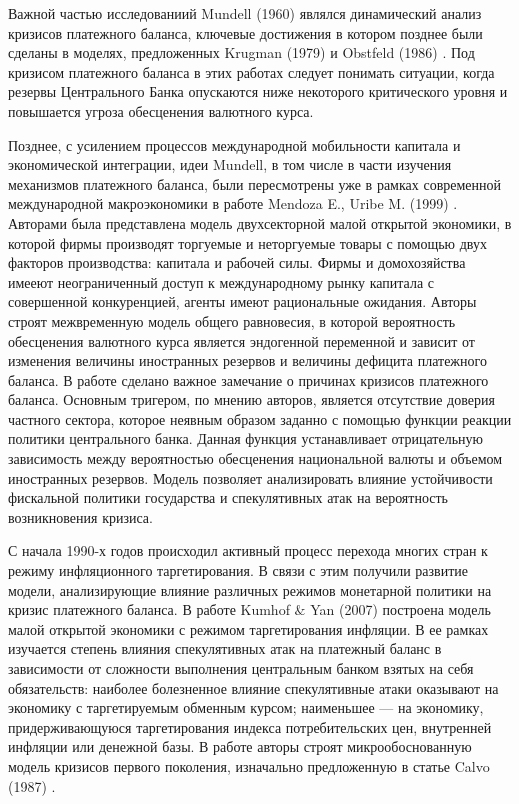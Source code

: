\documentclass[a4paper, 14pt]{extarticle}
\begin{document}
Важной частью исследованиий Mundell (1960) \autocite{mundell1960monetary} являлся динамический анализ кризисов платежного баланса, ключевые достижения в котором позднее были сделаны в моделях, предложенных Krugman (1979) \autocite{krugman1979model} и Obstfeld (1986) \autocite{obstfeld1986speculative}. 
Под кризисом платежного баланса в этих работах следует понимать ситуации, когда резервы Центрального Банка опускаются ниже некоторого критического уровня и повышается угроза обесценения валютного курса.

Позднее, с усилением процессов международной мобильности капитала и экономической интеграции, идеи Mundell, в том числе в части изучения механизмов платежного баланса, были пересмотрены уже в рамках современной  международной макроэкономики в работе Mendoza E., Uribe M. (1999) \autocite{mendoza1999business}. 
Авторами была представлена модель двухсекторной малой открытой экономики, в которой фирмы производят торгуемые и неторгуемые товары с помощью двух факторов производства: капитала и рабочей силы. 
Фирмы и домохозяйства имееют неограниченный доступ к международному рынку капитала с совершенной конкуренцией, агенты имеют рациональные ожидания. 
Авторы строят межвременную модель общего равновесия, в которой вероятность обесценения валютного курса является эндогенной переменной и зависит от изменения величины иностранных резервов и величины дефицита платежного баланса.  
В работе сделано важное замечание о причинах кризисов платежного баланса.
Основным тригером, по мнению авторов, является отсутствие доверия частного сектора, которое неявным образом заданно с помощью функции реакции политики центрального банка. 
Данная функция устанавливает отрицательную зависимость между вероятностью обесценения национальной валюты и объемом иностранных резервов. 
Модель позволяет анализировать влияние устойчивости фискальной политики государства и  спекулятивных атак на вероятность возникновения кризиса.

С начала 1990-х годов происходил активный процесс перехода многих стран к режиму инфляционного таргетирования. 
В связи с этим получили развитие модели, анализирующие влияние различных режимов монетарной политики на кризис платежного баланса.  
В работе Kumhof $\&$ Yan (2007) \autocite{kumhof2007balance} построена модель малой открытой экономики с режимом таргетирования инфляции.
В ее рамках изучается степень влияния спекулятивных атак на платежный баланс в зависимости от сложности выполнения центральным банком взятых на себя обязательств: наиболее болезненное влияние спекулятивные атаки оказывают на экономику с таргетируемым обменным курсом; наименьшее — на экономику, придерживающуюся таргетирования индекса потребительских цен, внутренней инфляции или денежной базы. 
В работе авторы строят микрообоснованную модель кризисов первого поколения, изначально предложенную в статье Calvo (1987) \autocite{calvo1987balance}.
\end{document}

